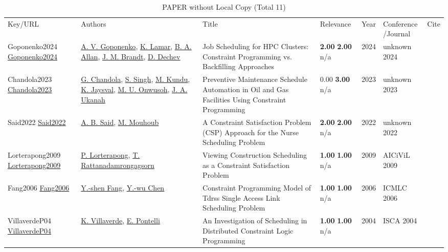 {\scriptsize
\begin{longtable}{p{3cm}p{5cm}p{10cm}p{1cm}rp{2.5cm}l}
\rowcolor{white}\caption{PAPER without Local Copy (Total 11)}\\ \toprule
\rowcolor{white}Key/URL & Authors & Title & Relevance &Year & \shortstack{Conference\\/Journal} & Cite\\ \midrule
\endhead
\bottomrule
\endfoot
Goponenko2024 \href{https://doi.org/10.1145/3629104.3666038}{Goponenko2024} & \hyperref[auth:a2137]{A. V. Goponenko}, \hyperref[auth:a2138]{K. Lamar}, \hyperref[auth:a2139]{B. A. Allan}, \hyperref[auth:a2140]{J. M. Brandt}, \hyperref[auth:a2141]{D. Dechev} & \cellcolor{green!10}Job Scheduling for HPC Clusters: Constraint Programming vs. Backfilling Approaches & \noindent{}\textbf{2.00} \textbf{2.00} n/a & 2024 & unknown 2024 & \cite{Goponenko2024}\\
Chandola2023 \href{https://doi.org/10.2118/215009-ms}{Chandola2023} & \hyperref[auth:a2119]{G. Chandola}, \hyperref[auth:a2120]{S. Singh}, \hyperref[auth:a2121]{M. Kundu}, \hyperref[auth:a2122]{K. Jaysval}, \hyperref[auth:a2123]{M. U. Onwusoh}, \hyperref[auth:a2124]{J. A. Ukanah} & Preventive Maintenance Schedule Automation in Oil and Gas Facilities Using Constraint Programming & \noindent{}\textcolor{black!50}{0.00} \textbf{3.00} n/a & 2023 & unknown 2023 & \cite{Chandola2023}\\
Said2022 \href{https://doi.org/10.1109/ssci51031.2022.10022250}{Said2022} & \hyperref[auth:a2233]{A. B. Said}, \hyperref[auth:a2234]{M. Mouhoub} & A Constraint Satisfaction Problem (CSP) Approach for the Nurse Scheduling Problem & \noindent{}\textbf{2.00} \textbf{2.00} n/a & 2022 & unknown 2022 & \cite{Said2022}\\
Lorterapong2009 \href{http://dx.doi.org/10.4203/ccp.74.8}{Lorterapong2009} & \hyperref[auth:a1936]{P. Lorterapong}, \hyperref[auth:a1937]{T. Rattanadamrongagsorn} & Viewing Construction Scheduling as a Constraint Satisfaction Problem & \noindent{}\textbf{1.00} \textbf{1.00} n/a & 2009 & AICiViL 2009 & \cite{Lorterapong2009}\\
Fang2006 \href{https://doi.org/10.1109/icmlc.2006.258521}{Fang2006} & \hyperref[auth:a2204]{Y.-shen Fang}, \hyperref[auth:a2205]{Y.-wu Chen} & Constraint Programming Model of Tdrss Single Access Link Scheduling Problem & \noindent{}\textbf{1.00} \textbf{1.00} n/a & 2006 & ICMLC 2006 & \cite{Fang2006}\\
VillaverdeP04 \href{}{VillaverdeP04} & \hyperref[auth:a657]{K. Villaverde}, \hyperref[auth:a33]{E. Pontelli} & An Investigation of Scheduling in Distributed Constraint Logic Programming & \noindent{}\textbf{1.00} \textbf{1.00} n/a & 2004 & ISCA 2004 & \cite{VillaverdeP04}\\

\end{longtable}}
